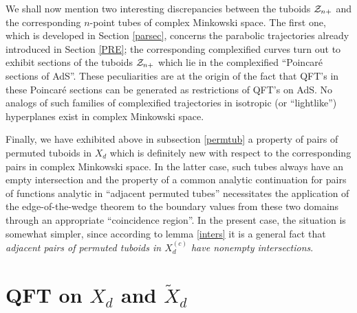 \documentclass[a4paper,a4paper]{article}
\let\UnmodifSec=\section
\renewcommand{\section}{\setcounter{equation}{0}\UnmodifSec}
\def\ZZ{{\cal Z}}
\def\wt{\widetilde}
\begin{document}
\vskip 0.3cm
We shall now mention two interesting discrepancies between the
tuboids $\ZZ_{n+}$ and the corresponding $n$-point tubes of
complex Minkowski space.
The first one, which is developed in Section \ref{parsec},
concerns the parabolic trajectories already introduced in Section
\ref{PRE}; the corresponding complexified curves
turn out to exhibit sections of the
tuboids $\ZZ_{n+}$ which lie in
the complexified ``Poincar\'e sections of AdS''.
These peculiarities are at the origin of the fact that
QFT's in these Poincar\'e sections can be generated as
restrictions of QFT's on AdS.
No analogs of such families of complexified trajectories
in isotropic (or ``lightlike'')
hyperplanes exist in complex Minkowski space.

\vskip 0.2cm
Finally, we have exhibited above in subsection \ref{permtub}
a property of pairs of permuted tuboids in $X_d$ which is definitely
new with respect to the corresponding pairs in complex Minkowski space.
In the latter case, such tubes always have an empty intersection
and the property of a common analytic continuation
for pairs of functions analytic in ``adjacent permuted
tubes''
necessitates the application of the edge-of-the-wedge theorem
to the
boundary values from these two domains
through an appropriate ``coincidence region''.
In the present case, the situation is somewhat simpler,
since according to lemma \ref{inters}
it is a general fact that {\sl adjacent pairs of permuted tuboids in
$X_d^{(c)}$ have nonempty intersections}.

\section{QFT on $X_d$ and $\wt X_d$}
\end{document}

